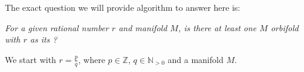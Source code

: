 The exact question we will provide algorithm to answer here is: 

\textit{For a given rational number $r$ and manifold $M$, is there at least one 
$M$ orbifold with $r$ as its \Eoc?}


We start with $r=\frac{p}{q}$, where $p \in \mathbb{Z}$, $q \in \mathbb{N}_{>0}$ and a manifold $M$. 

